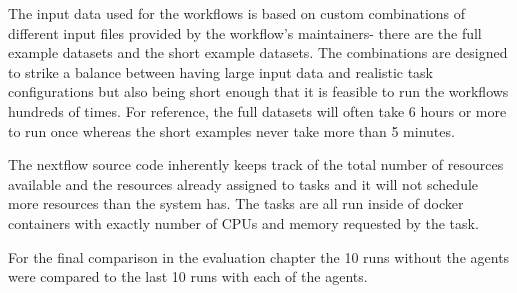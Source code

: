 The input data used for the workflows is based on custom combinations of different input files provided by the workflow's maintainers- there are the full example datasets and the short example datasets. The combinations are designed to strike a balance between having large input data and realistic task configurations but also being short enough that it is feasible to run the workflows hundreds of times. For reference, the full datasets will often take 6 hours or more to run once whereas the short examples never take more than 5 minutes. 

The nextflow source code inherently keeps track of the total number of resources available and the resources already assigned to tasks and it will not schedule more resources than the system has. The tasks are all run inside of docker containers with exactly number of CPUs and memory requested by the task. 

For the final comparison in the evaluation chapter the 10 runs without the agents were compared to the last 10 runs with each of the agents.


